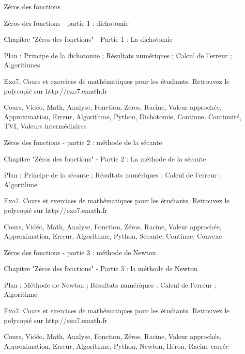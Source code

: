 
   Zéros des fonctions




Zéros des fonctions - partie 1 : dichotomie



Chapitre "Zéros des fonctions" - Partie 1 : La dichotomie

Plan : Principe de la dichotomie ; Résultats numériques ; Calcul de l'erreur ;
Algorithmes

Exo7. Cours et exercices de mathématiques pour les étudiants.
Retrouvez le polycopié sur http://exo7.emath.fr


Cours, Vidéo, Math, Analyse, Fonction, Zéros, Racine, 
Valeur approchée, Approximation, Erreur, Algorithme, Python, 
Dichotomie, Continue, Continuité, TVI, Valeurs intermédiaires



Zéros des fonctions - partie 2 : méthode de la sécante



Chapitre "Zéros des fonctions" - Partie 2 : La méthode de la sécante

Plan : Principe de la sécante ; Résultats numériques ; Calcul de l'erreur ;
Algorithme

Exo7. Cours et exercices de mathématiques pour les étudiants.
Retrouvez le polycopié sur http://exo7.emath.fr


Cours, Vidéo, Math, Analyse, Fonction, Zéros, Racine, 
Valeur approchée, Approximation, Erreur, Algorithme, Python,
Sécante, Continue, Convexe 




Zéros des fonctions - partie 3 : méthode de Newton



Chapitre "Zéros des fonctions" - Partie 3 : la méthode de Newton

Plan : Méthode de Newton ; Résultats numériques ; Calcul de l'erreur ;
Algorithme

Exo7. Cours et exercices de mathématiques pour les étudiants.
Retrouvez le polycopié sur http://exo7.emath.fr


Cours, Vidéo, Math, Analyse, Fonction, Zéros, Racine,
Valeur approchée, Approximation, Erreur, Algorithme, Python, Newton, Héron,
Racine carrée


